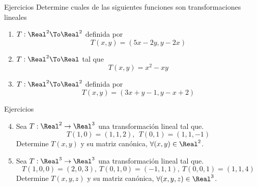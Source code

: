 \begin{frame}{Ejercicios}
  Determine cuales de las siguientes funciones son transformaciones lineales
  \begin{enumerate}
  \item $T:\Real^2\To \Real^2$ definida por $$T(x,y)=(5x-2y,y-2x)$$
  \item $T:\Real^2\To\Real$ tal que $$T(x,y)=x^2-xy$$
  \item $T:\Real^2\To \Real^2$ definida por $$T(x,y)=(3x+y-1,y-x+2)$$
  \end{enumerate}
\end{frame}

\begin{frame}{Ejercicios}
  \begin{enumerate}
  \setcounter{enumi}{3}
  \item  Sea $T:\Real^2\to\Real^3$ una transformación lineal tal que.
  $$T(1,0)=(1,1,2),\ \ T(0,1)=(1,1,-1)$$
  Determine $T(x,y)$ y su matriz canónica, $\forall(x,y)\in\Real^2$.
  \vspace{5mm}
  \item  Sea $T:\Real^3\to\Real^3$ una transformación lineal tal que.
  $$T(1,0,0)=(2,0,3),\ T(0,1,0)=(-1,1,1),\ T(0,0,1)=(1,1,4)$$
  Determine $T(x,y,z)$ y su matriz canónica, $\forall(x,y,z)\in\Real^3$.
  \end{enumerate}
\end{frame}


